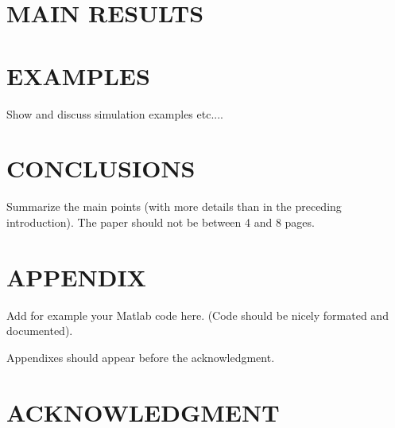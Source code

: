 \documentclass[letterpaper, 10 pt, conference]{ieeeconf}  %
\begin{document}
\section{MAIN RESULTS}


\section{EXAMPLES}

Show and discuss simulation examples etc....



\section{CONCLUSIONS}

Summarize the main points (with more details than in the preceding introduction).
The paper should not be between 4 and 8 pages.



\addtolength{\textheight}{-12cm}   %



\section*{APPENDIX}

Add for example your Matlab code here. (Code should be nicely formated and documented).

Appendixes should appear before the acknowledgment.

\section*{ACKNOWLEDGMENT}
\end{document}
